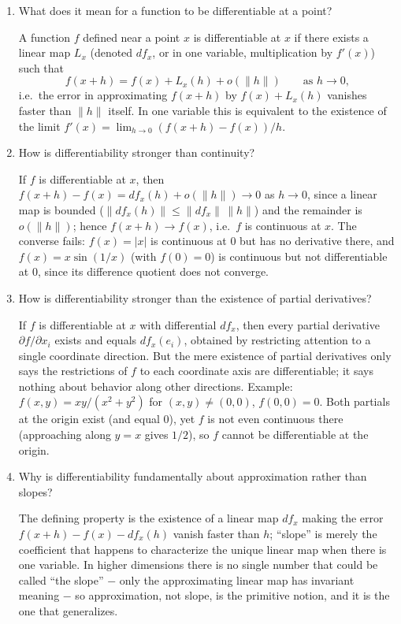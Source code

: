 \documentclass{essay}
\begin{document}
\begin{enumerate}[leftmargin=*, itemsep=8pt]

\item What does it mean for a function to be differentiable at a point?
\begin{answer}
A function \(f\) defined near a point \(x\) is differentiable at \(x\) if there exists a linear map \(L_x\) (denoted \(df_x\), or in one variable, multiplication by \(f'(x)\)) such that
\[
f(x+h) = f(x) + L_x(h) + o(\|h\|) \qquad \text{as } h\to0,
\]
i.e.\ the error in approximating \(f(x+h)\) by \(f(x)+L_x(h)\) vanishes faster than \(\|h\|\) itself. In one variable this is equivalent to the existence of the limit \(f'(x)=\lim_{h\to0}(f(x+h)-f(x))/h\).
\end{answer}

\item How is differentiability stronger than continuity?
\begin{answer}
If \(f\) is differentiable at \(x\), then \(f(x+h)-f(x)=df_x(h)+o(\|h\|)\to0\) as \(h\to0\), since a linear map is bounded (\(\|df_x(h)\|\le\|df_x\|\,\|h\|\)) and the remainder is \(o(\|h\|)\); hence \(f(x+h)\to f(x)\), i.e.\ \(f\) is continuous at \(x\). The converse fails: \(f(x)=|x|\) is continuous at \(0\) but has no derivative there, and \(f(x)=x\sin(1/x)\) (with \(f(0)=0\)) is continuous but not differentiable at \(0\), since its difference quotient does not converge.
\end{answer}

\item How is differentiability stronger than the existence of partial derivatives?
\begin{answer}
If \(f\) is differentiable at \(x\) with differential \(df_x\), then every partial derivative \(\partial f/\partial x_i\) exists and equals \(df_x(e_i)\), obtained by restricting attention to a single coordinate direction. But the mere existence of partial derivatives only says the restrictions of \(f\) to each coordinate axis are differentiable; it says nothing about behavior along other directions. Example: \(f(x,y)=xy/(x^2+y^2)\) for \((x,y)\ne(0,0)\), \(f(0,0)=0\). Both partials at the origin exist (and equal \(0\)), yet \(f\) is not even continuous there (approaching along \(y=x\) gives \(1/2\)), so \(f\) cannot be differentiable at the origin.
\end{answer}

\item Why is differentiability fundamentally about approximation rather than slopes?
\begin{answer}
The defining property is the existence of a linear map \(df_x\) making the error \(f(x+h)-f(x)-df_x(h)\) vanish faster than \(h\); ``slope'' is merely the coefficient that happens to characterize the unique linear map when there is one variable. In higher dimensions there is no single number that could be called ``the slope'' \(-\) only the approximating linear map has invariant meaning \(-\) so approximation, not slope, is the primitive notion, and it is the one that generalizes.
\end{answer}


\end{enumerate}
\end{document}

